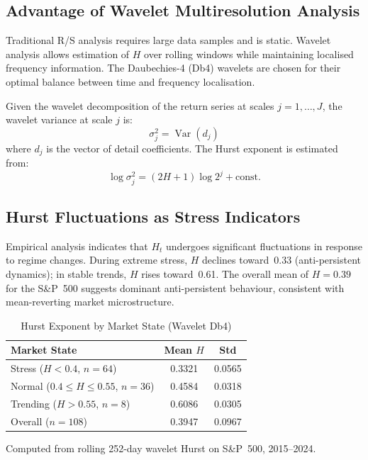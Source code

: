 \documentclass[12pt,a4paper]{article}
\begin{document}
\subsection{Advantage of Wavelet Multiresolution Analysis}

Traditional R/S analysis requires large data samples and is static.
Wavelet analysis allows estimation of $H$ over rolling windows while
maintaining localised frequency information.  The Daubechies-4 (Db4)
wavelets are chosen for their optimal balance between time and frequency
localisation.

Given the wavelet decomposition of the return series at scales
$j = 1, \ldots, J$, the wavelet variance at scale $j$ is:
\begin{equation}
  \sigma_j^2 = \operatorname{Var}(d_j)
  \label{eq:wavvar}
\end{equation}
where $d_j$ is the vector of detail coefficients.  The Hurst exponent is
estimated from:
\begin{equation}
  \log \sigma_j^2 = (2H + 1)\log 2^j + \text{const.}
  \label{eq:wavhurst}
\end{equation}

\subsection{Hurst Fluctuations as Stress Indicators}

Empirical analysis indicates that $H_t$ undergoes significant fluctuations
in response to regime changes.  During extreme stress, $H$ declines
toward~0.33 (anti-persistent dynamics); in stable trends, $H$ rises
toward~0.61.  The overall mean of $H = 0.39$ for the S\&P~500 suggests
dominant anti-persistent behaviour, consistent with mean-reverting market
microstructure.

\begin{table}[htbp]
  \centering
  \caption{Hurst Exponent by Market State (Wavelet Db4)}
  \label{tab:hurst_state}
  \begin{threeparttable}
  \begin{tabular}{lcc}
    \toprule
    \textbf{Market State} & \textbf{Mean $H$} & \textbf{Std} \\
    \midrule
    Stress ($H < 0.4$, $n=64$)    & 0.3321 & 0.0565 \\
    Normal ($0.4 \le H \le 0.55$, $n=36$) & 0.4584 & 0.0318 \\
    Trending ($H > 0.55$, $n=8$)  & 0.6086 & 0.0305 \\
    \midrule
    Overall ($n=108$)             & 0.3947 & 0.0967 \\
    \bottomrule
  \end{tabular}
  \begin{tablenotes}\small
    \item Computed from rolling 252-day wavelet Hurst on S\&P~500, 2015--2024.
  \end{tablenotes}
  \end{threeparttable}
\end{table}
\end{document}
